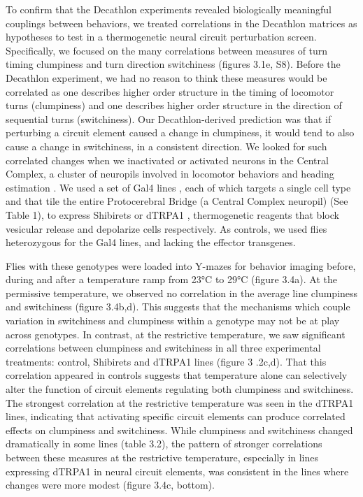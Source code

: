 \documentclass[12pt,letterpaper]{article}
\begin{document}
To confirm that the Decathlon experiments revealed biologically meaningful couplings between behaviors, we treated correlations in the Decathlon matrices as hypotheses to test in a thermogenetic neural circuit perturbation screen. Specifically, we focused on the many correlations between measures of turn timing clumpiness and turn direction switchiness (figures 3.1e, S8). Before the Decathlon experiment, we had no reason to think these measures would be correlated as one describes higher order structure in the timing of locomotor turns (clumpiness) and one describes higher order structure in the direction of sequential turns (switchiness). Our Decathlon-derived prediction was that if perturbing a circuit element caused a change in clumpiness, it would tend to also cause a change in switchiness, in a consistent direction.  We looked for such correlated changes when we inactivated or activated neurons in the Central Complex, a cluster of neuropils involved in locomotor behaviors \cite{Buchanan_Neuronal_2015,Ofstad_Visual_2011,Kottler_Inverse_2019} and heading estimation \cite{Seelig_Neural_2015,green_nature_2017,Kakaria_Ring_2017}. We used a set of Gal4 lines \cite{Wolff_Neuroarchitecture_2018}, each of which targets a single cell type and that tile the entire Protocerebral Bridge (a Central Complex neuropil) (See Table 1), to express Shibirets \cite{of_neurobiology_Conditional_2001} or dTRPA1 \cite{Hamada_An_2008}, thermogenetic reagents that block vesicular release and depolarize cells respectively. As controls, we used flies heterozygous for the Gal4 lines, and lacking the effector transgenes. 

Flies with these genotypes were loaded into Y-mazes for behavior imaging before, during and after a temperature ramp from 23°C to 29°C (figure 3.4a). At the permissive temperature, we observed no correlation in the average line clumpiness and switchiness (figure 3.4b,d). This suggests that the mechanisms which couple variation in switchiness and clumpiness within a genotype may not be at play across genotypes. In contrast, at the restrictive temperature, we saw significant correlations between clumpiness and switchiness in all three experimental treatments: control, Shibirets and dTRPA1 lines (figure 3 .2c,d). That this correlation appeared in controls suggests that temperature alone can selectively alter the function of circuit elements regulating both clumpiness and switchiness. The strongest correlation at the restrictive temperature was seen in the dTRPA1 lines, indicating that activating specific circuit elements can produce correlated effects on clumpiness and switchiness. While clumpiness and switchiness changed dramatically in some lines (table 3.2), the pattern of stronger correlations between these measures at the restrictive temperature, especially in lines expressing dTRPA1 in neural circuit elements, was consistent in the lines where changes were more modest (figure 3.4c, bottom).
\end{document}

